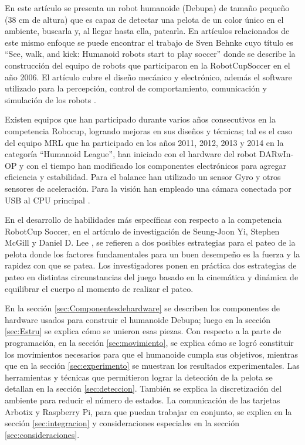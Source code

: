 \documentclass[tikz,conference, letterpaper]{IEEEtranMC1}
\begin{document}
En este artículo se presenta un robot humanoide (Debupa) de tamaño pequeño (38 cm de altura) que es capaz de detectar una pelota de un color único en el ambiente, buscarla y, al llegar hasta ella, patearla. En artículos relacionados de este mismo enfoque se puede encontrar el trabajo de Sven Behnke cuyo título es “See, walk, and kick: Humanoid robots start to play soccer” donde se describe la construcción del equipo de robots que participaron en la RobotCupSoccer en el a\~no 2006. El artículo cubre el diseño mecánico y electrónico, además el software utilizado para la percepción, control de comportamiento, comunicación y simulación de los robots \cite{paper}. 

Existen equipos que han participado durante varios años consecutivos en la competencia Robocup, logrando mejoras en sus diseños y técnicas; tal es el caso del equipo MRL que ha participado en los años 2011, 2012, 2013 y 2014 en la categoría “Humanoid League”, han iniciado con el hardware del robot DARwIn-OP y con el tiempo han modificado los componentes electrónicos para agregar eficiencia y estabilidad. Para el balance han utilizado un sensor Gyro y otros sensores de aceleración. Para la visión han empleado una cámara conectada por USB al CPU principal \cite{paper1}. 

En el desarrollo de habilidades más específicas con respecto a la competencia RobotCup Soccer, en el artículo de investigación de Seung-Joon Yi, Stephen McGill y Daniel D. Lee  \cite{paper2}, se refieren a dos posibles estrategias para el pateo de la pelota donde los factores fundamentales para un buen desempeño es la fuerza y la rapidez con que se patea. Los investigadores ponen en pr\'actica dos estrategias de pateo en distintas circunstancias del juego basado en la cinemática y dinámica de equilibrar el cuerpo al momento de realizar el pateo.

En la secci\'on \ref{sec:Componentesdehardware} se describen los componentes de hardware usados para construir el humanoide Debupa; luego en la sección \ref{sec:Estru}
 se explica cómo se unieron esas piezas. Con respecto a la parte de programación, en la secci\'on \ref{sec:movimiento}, se explica c\'omo se logró constituir los movimientos necesarios para que el humanoide cumpla sus objetivos, mientras que en la secci\'on \ref{sec:experimento} se muestran los resultados experimentales. Las herramientas y técnicas  que  permitieron lograr  la detección de la pelota se detallan en la secci\'on \ref{sec:deteccion}. También se explica la discretización del ambiente para reducir el n\'umero de estados. La comunicación de las tarjetas Arbotix y Raspberry Pi, para que puedan trabajar en conjunto, se explica en la secci\'on \ref{sec:integracion}  y consideraciones especiales en la secci\'on \ref{sec:consideraciones}. 
\end{document}
